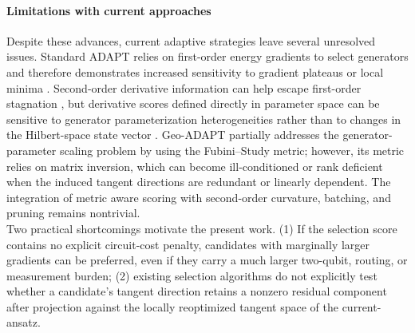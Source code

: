\documentclass[
  reprint,
  amsmath,
  amssymb,
  aps,
  pra,
  nofootinbib,
  superscriptaddress,
  floatfix
]{revtex4-2}
\begin{document}
\paragraph*{Limitations with current approaches}
Despite these advances, current adaptive strategies leave several unresolved issues. Standard ADAPT relies on first-order energy gradients to select generators \cite{Grimsley2019,Tang2021,Yordanov2021} and therefore demonstrates increased sensitivity to gradient plateaus or local minima \cite{Feniou2023,Grimsley2023ADAPT}.
Second-order derivative information can help escape first-order stagnation \cite{Ramoa2025HessianRecycling}, but derivative scores defined directly in parameter space can be sensitive to generator parameterization heterogeneities rather than to changes in the Hilbert-space state vector \cite{ProvostVallee1980,Stokes2020QNG}. Geo-ADAPT partially addresses the generator-parameter scaling problem by using the Fubini--Study metric; however, its metric relies on matrix inversion, which can become ill-conditioned or rank deficient when the induced tangent directions are redundant or linearly dependent\cite{Sohail2026GeoADAPT}. The integration of metric aware scoring with second-order curvature, batching, and pruning remains nontrivial.\\
\noindent
Two practical shortcomings motivate the present work. (1) If the selection score contains no explicit circuit-cost penalty, candidates with marginally larger gradients can be preferred, even if they carry a much larger two-qubit, routing, or measurement burden; (2) existing selection algorithms do not explicitly test whether a candidate's tangent direction retains a nonzero residual component after projection against the locally reoptimized tangent space of the current-ansatz.
%
\end{document}
